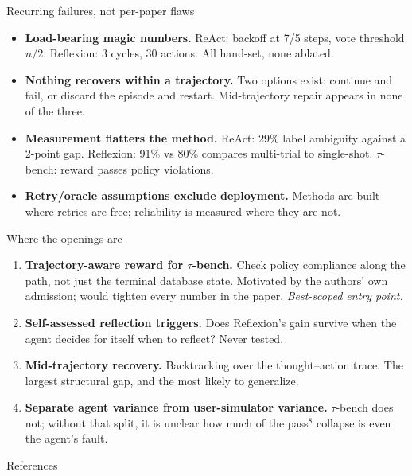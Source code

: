 \documentclass[aspectratio=169]{beamer}
\begin{document}
\begin{frame}{Recurring failures, not per-paper flaws}
  \begin{itemize}
    \item \textbf{Load-bearing magic numbers.} ReAct: backoff at 7/5 steps, vote
      threshold $n/2$. Reflexion: 3 cycles, 30 actions. All hand-set, none
      ablated.
    \item \textbf{Nothing recovers within a trajectory.} Two options exist:
      continue and fail, or discard the episode and restart. Mid-trajectory
      repair appears in none of the three.
    \item \textbf{Measurement flatters the method.} ReAct: 29\% label ambiguity
      against a 2-point gap. Reflexion: 91\% vs 80\% compares multi-trial to
      single-shot. $\tau$-bench: reward passes policy violations.
    \item \textbf{Retry/oracle assumptions exclude deployment.} Methods are built
      where retries are free; reliability is measured where they are not.
  \end{itemize}
\end{frame}

\begin{frame}{Where the openings are}
  \begin{enumerate}
    \item \textbf{Trajectory-aware reward for $\tau$-bench.} Check policy
      compliance along the path, not just the terminal database state. Motivated
      by the authors' own admission; would tighten every number in the paper.
      \emph{Best-scoped entry point.}
    \item \textbf{Self-assessed reflection triggers.} Does Reflexion's gain
      survive when the agent decides for itself when to reflect? Never tested.
    \item \textbf{Mid-trajectory recovery.} Backtracking over the
      thought--action trace. The largest structural gap, and the most likely to
      generalize.
    \item \textbf{Separate agent variance from user-simulator variance.}
      $\tau$-bench does not; without that split, it is unclear how much of the
      pass$^8$ collapse is even the agent's fault.
  \end{enumerate}
\end{frame}

\begin{frame}[allowframebreaks]{References}
  
  
\end{frame}
\end{document}
